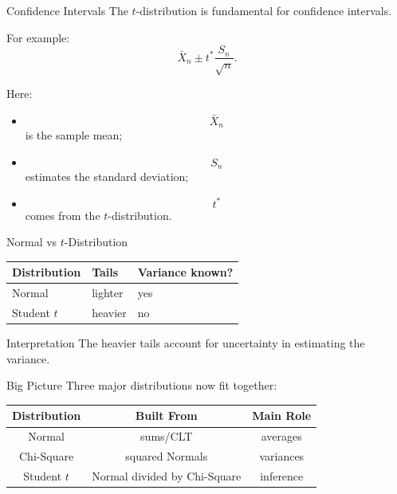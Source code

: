 \begin{frame}{Confidence Intervals}
The \(t\)-distribution is fundamental for confidence intervals.

\vspace{0.25cm}

For example:
\[
\bar X_n
\pm
t^\ast
\frac{
S_n
}{
\sqrt n
}.
\]

\vspace{0.25cm}

Here:
\begin{itemize}
    \item
    \[
    \bar X_n
    \]
    is the sample mean;

    \item
    \[
    S_n
    \]
    estimates the standard deviation;

    \item
    \[
    t^\ast
    \]
    comes from the \(t\)-distribution.
\end{itemize}
\end{frame}

\begin{frame}{Normal vs \(t\)-Distribution}
\begin{center}
\renewcommand{\arraystretch}{1.5}
\begin{tabular}{lll}
\toprule
Distribution & Tails & Variance known? \\
\midrule
Normal & lighter & yes \\
Student \(t\) & heavier & no \\
\bottomrule
\end{tabular}
\end{center}

\vspace{0.25cm}

\begin{keybox}{Interpretation}
The heavier tails account for uncertainty in estimating the variance.
\end{keybox}
\end{frame}

\begin{frame}{Big Picture}
Three major distributions now fit together:

\vspace{0.25cm}

\begin{center}
\renewcommand{\arraystretch}{1.6}
\begin{tabular}{ccc}
\toprule
Distribution & Built From & Main Role \\
\midrule
Normal & sums/CLT & averages \\
Chi-Square & squared Normals & variances \\
Student \(t\) & Normal divided by Chi-Square & inference \\
\bottomrule
\end{tabular}
\end{center}
\end{frame}

